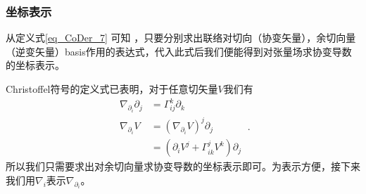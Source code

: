 \subsubsection{坐标表示}
从定义式\autoref{eq_CoDer_7} 可知 ，只要分别求出联络对切向（协变矢量），余切向量（逆变矢量）basis作用的表达式，代入此式后我们便能得到对张量场求协变导数的坐标表示。

Christoffel符号的定义式已表明，对于任意切矢量$V$我们有
\begin{equation}
\begin{aligned}
\nabla_{\partial_i}\partial_j&=\Gamma^k_{ij}\partial_k\\
\nabla_{\partial_i}V&=(\nabla_{\partial_i} V)^j\partial_j\\
&=(\partial_iV^j+\Gamma^j_{ik}V^k)\partial_j
\end{aligned}~.
\end{equation}
所以我们只需要求出对余切向量求协变导数的坐标表示即可。为表示方便，接下来我们用$\nabla_i$表示$\nabla_{\partial_i}$。

